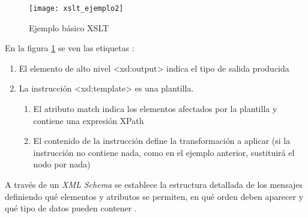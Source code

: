  \begin{figure}[h]
    \centering
    \texttt{[image: xslt\_ejemplo2]}
    \caption{Ejemplo básico XSLT}
    \label{figura:xslt_ejemplo2}
  \end{figure}
En la figura \ref{figura:xslt_ejemplo2} se ven las etiquetas \cite{XSLT:definiciones}:
        \begin{enumerate}
        \item El elemento de alto nivel <xsl:output> indica el tipo de salida producida
        \item La instrucción <xsl:template> es una plantilla.
          \begin{enumerate}
          \item El atributo match indica los elementos afectados por la plantilla y contiene una expresión XPath
          \item El contenido de la instrucción define la transformación a aplicar (si la instrucción no contiene nada, como en el ejemplo anterior, sustituirá el nodo por nada)
          \end{enumerate}
        \end{enumerate}
A través de un \emph{XML Schema} se establece la estructura detallada de los mensajes definiendo qué elementos y atributos se permiten, en qué orden deben aparecer y qué tipo de datos pueden contener \citep{Tesis:LauraGonzalez:PlataformaESB,XML:W3C}.
